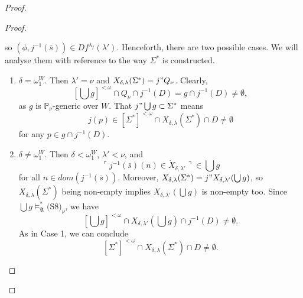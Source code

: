 \documentclass[12pt]{article}
\numberwithin{equation}{section}
\begin{document}
\begin{proof}
\begin{proof}
\begin{enumerate}[label=<$k$> $\eq$ \arabic* :, leftmargin=70pt]
\begin{itemize}
    \end{itemize}
    so $(\phi, j^{-1}(\bar{s})) \in Df^{\lambda_f}(\lambda')$. Henceforth, there are two possible cases. We will analyse them with reference to the way $\Sigma^*$ is constructed. 
    \begin{enumerate}[label=Case \arabic*:, leftmargin=50pt]
        \item\label{c8c1} $\delta = \omega_1^W$. Then $\lambda' = \nu$ and $X_{\delta, \lambda}(\Sigma^*) = j" Q_{\nu}$. Clearly, $$[\bigcup g]^{< \omega} \cap Q_{\nu} \cap j^{-1}(D) = g \cap j^{-1}(D) \neq \emptyset,$$ as $g$ is $\mathbb{P}_{\nu}$-generic over $W$. That $j" \bigcup g \subset \Sigma^*$ means $$j(p) \in [\Sigma^*]^{< \omega} \cap X_{\delta, \lambda}(\Sigma^*) \cap D \neq \emptyset$$ for any $p \in g \cap j^{-1}(D)$.
        \item $\delta \neq \omega_1^W$. Then $\delta < \omega_1^W$, $\lambda' < \nu$, and $$\ulcorner j^{-1}(\bar{s})(n) \in \dot{X}_{\delta, \lambda'} \urcorner \in \bigcup g$$ for all $n \in dom(j^{-1}(\bar{s}))$. Moreover, $X_{\delta, \lambda}(\Sigma^*) = j" X_{\delta, \lambda'}(\bigcup g)$, so $X_{\delta, \lambda}(\Sigma^*)$ being non-empty implies $X_{\delta, \lambda'}(\bigcup g)$ is non-empty too. Since $\bigcup g \models^*_{\mathfrak{A}} \text{(S8)}_{\nu}$, we have $$[\bigcup g]^{< \omega} \cap X_{\delta, \lambda'}(\bigcup g) \cap j^{-1}(D) \neq \emptyset.$$ As in Case 1, we can conclude $$[\Sigma^*]^{< \omega} \cap X_{\delta, \lambda}(\Sigma^*) \cap D \neq \emptyset.$$
    \end{enumerate}
\end{enumerate}


\end{proof}
\end{proof}
\end{document}
